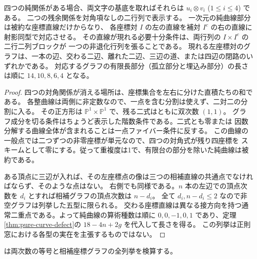 \begin{proposition}\label{prop:curve-graph-four-pure-frame}
四つの純関係がある場合、両文字の基底を取ればそれらは $u_i\otimes v_i$ ($1\le i\le4$) である。
二つの残余関係を対角項なしの二行列で表示する。
一次元の純曲線部分は被約な座標直線だけからなり、
各座標対 $I$ の左の直線を補対 $I^c$ の右の直線に射影同型で対応させる。
その直線が現れる必要十分条件は、両行列の $I\times I^c$ の二行二列ブロックが
一つの非退化行列を張ることである。
現れる左座標対のグラフは、一本の辺、交わる二辺、離れた二辺、三辺の道、または四辺の閉路のいずれかである。
対応するグラフの有限長部分（孤立部分と埋込み部分）の長さは順に $14,10,8,6,4$ となる。
\end{proposition}
\begin{proof}
四つの対角関係が消える場所は、座標集合を左右に分けた直積たちの和である。
各整曲線は両側に非定数なので、一点を含む分割は使えず、二対二の分割に入る。
その正方形は $\mathbb P^1\times\mathbb P^1$ で、残る二式はともに双次数 $(1,1)$。
グラフ成分を切る条件はちょうど表示した階数条件である。二式とも零または
因数分解する曲線全体が含まれることは一点ファイバー条件に反する。
この曲線の一般点では二つずつの非零座標が単元なので、四つの対角式が残り四座標を
スキームとして零にする。従って重複度は1で、有限台の部分を除いた純曲線は被約である。

ある頂点に三辺が入れば、その左座標点の像は三つの相補直線の共通点でなければならず、そのような点はない。
右側でも同様である。$n$ 本の左辺での頂点次数を $d_i$ とすれば相補グラフの頂点次数は $n-d_i$。
全て $d_i,n-d_i\le2$ なので非空グラフは列挙した五型に限られる。
交わる座標直線は異なる接方向を持つ通常二重点である。よって純曲線の算術種数は順に
$0,0,-1,0,1$ であり、定理\ref{thm:pure-curve-defect}の $18-4n+2g$ を代入して長さを得る。
この列挙は正則窓における各型の実在を主張するものではない。
\end{proof}
は両次数の等号と相補座標グラフの全列挙を検算する。
